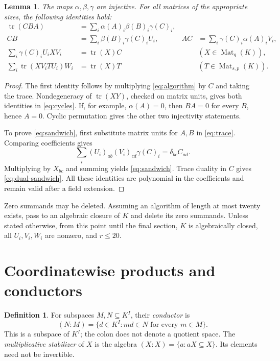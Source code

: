 \documentclass[11pt,a4paper]{article}
\numberwithin{equation}{section}
\theoremstyle{plain}
\newtheorem{lemma}[theorem]{Lemma}
\theoremstyle{definition}
\newtheorem{definition}[theorem]{Definition}
\DeclareMathOperator{\tr}{tr}\DeclareMathOperator{\rk}{rk}
\DeclareMathOperator{\Mat}{Mat}\DeclareMathOperator{\Span}{span}
\newcommand{\leqs}{\leqslant}\newcommand{\geqs}{\geqslant}
\begin{document}
\begin{lemma}\label{lem:identities}
The maps $\alpha,\beta,\gamma$ are injective. For all matrices of the
appropriate sizes, the following identities hold:
\begin{align}
 \tr(CBA)&=\sum_i\alpha(A)_i\beta(B)_i\gamma(C)_i,\label{eq:trace}\\
 CB&=\sum_i\beta(B)_i\gamma(C)_iU_i,&
 AC&=\sum_i\gamma(C)_i\alpha(A)_iV_i,\label{eq:cycles}\\
 \sum_i\gamma(C)_i U_i X V_i&=\tr(X)C
       &&(X\in\Mat_q(K)),\label{eq:sandwich}\\
 \sum_i\tr(XV_iTU_i)W_i&=\tr(X)T
       &&(T\in\Mat_{s,p}(K)).\label{eq:dual-sandwich}
\end{align}
\end{lemma}
\begin{proof}
The first identity follows by multiplying \eqref{eq:algorithm} by $C$
and taking the trace. Nondegeneracy of $\tr(XY)$, checked on matrix
units, gives both identities in \eqref{eq:cycles}.
If, for example, $\alpha(A)=0$, then $BA=0$ for every $B$, hence $A=0$.
Cyclic permutation gives the other two injectivity statements.

To prove \eqref{eq:sandwich}, first substitute matrix units for $A,B$
in \eqref{eq:trace}. Comparing coefficients gives
\[
 \sum_i(U_i)_{a b}(V_i)_{c d}\gamma(C)_i
       =\delta_{bc}C_{ad}.
\]
Multiplying by $X_{bc}$ and summing yields \eqref{eq:sandwich}.
Trace duality in $C$ gives \eqref{eq:dual-sandwich}.
All these identities are polynomial in the coefficients and remain
valid after a field extension.
\end{proof}

Zero summands may be deleted. Assuming an algorithm of length at most
twenty exists, pass to an algebraic closure of $K$ and delete its zero
summands. Unless stated otherwise, from this point until the final
section, $K$ is algebraically closed, all $U_i,V_i,W_i$ are nonzero,
and $r\leqs20$.

\section{Coordinatewise products and conductors}

\begin{definition}
For subspaces $M,N\subseteq K^I$, their \emph{conductor} is
\[
 (N:M)=\{d\in K^I:md\in N\text{ for every }m\in M\}.
\]
This is a subspace of $K^I$; the colon does not denote a quotient space.
The \emph{multiplicative stabilizer} of $X$ is the algebra
$(X:X)=\{a:aX\subseteq X\}$. Its elements need not be invertible.
\end{definition}
\end{document}
